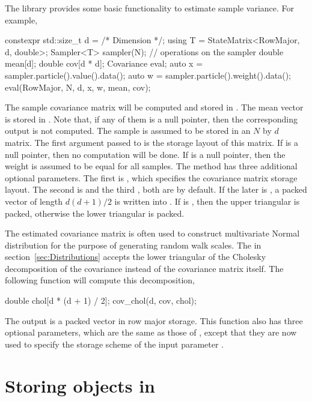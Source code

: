 The library provides some basic functionality to estimate sample variance. For
example,
\begin{cppcode}
  constexpr std::size_t d = /* Dimension */;
  using T = StateMatrix<RowMajor, d, double>;
  Sampler<T> sampler(N);
  // operations on the sampler
  double mean[d];
  double cov[d * d];
  Covariance eval;
  auto x = sampler.particle().value().data();
  auto w = sampler.particle().weight().data();
  eval(RowMajor, N, d, x, w, mean, cov);
\end{cppcode}
The sample covariance matrix will be computed and stored in .
The mean vector is stored in . Note that, if any of them is a
null pointer, then the corresponding output is not computed. The sample
 is assumed to be stored in an $N$ by $d$ matrix. The first
argument passed to  is the storage layout of this matrix. If
 is a null pointer, then no computation will be done. If
 is a null pointer, then the weight is assumed to be equal for all
samples. The method has three additional optional parameters. The first is
, which specifies the covariance matrix storage layout.
The second is  and the third , both
are  by default. If the later is , a
packed vector of length $d(d+1)/2$ is written into . If
 is , then the upper triangular is
packed, otherwise the lower triangular is packed.

The estimated covariance matrix is often used to construct multivariate Normal
distribution for the purpose of generating random walk scales. The
 in section~\ref{sec:Distributions} accepts
the lower triangular of the Cholesky decomposition of the covariance instead of
the covariance matrix itself. The following function will compute this
decomposition,
\begin{cppcode}
  double chol[d * (d + 1) / 2];
  cov_chol(d, cov, chol);
\end{cppcode}
The output  is a packed vector in row major storage. This
function also has three optional parameters, which are the same as those of
, except that they are now used to specify
the storage scheme of the input parameter .

\section{Storing objects in \protect\hdf}
\label{sec:Storing objects in HDF5}

